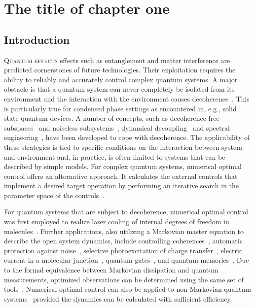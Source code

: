 
\chapter{The title of chapter one}

\section{Introduction}
\label{sec:intro}

\lettrine[lines=2]{Q}{uantum effects}
effects such as entanglement and matter interference are
predicted cornerstones of future technologies. Their exploitation
requires the ability to reliably and accurately control complex
quantum systems. A major obstacle is that a quantum system
can never completely be isolated from its environment and the
interaction with the environment causes 
decoherence~\cite{BreuerBook}. This is particularly true for condensed
phase settings as encountered in, e.g., solid state quantum devices. 
A number of concepts, such as decoherence-free subspaces~\cite{LidarPRL98}
and noiseless subsystems~\cite{LorenzaSci01}, dynamical
decoupling~\cite{LorenzaPRL99} and spectral
engineering~\cite{ClausenPRL10}, have been developed to cope with 
decoherence. The applicability of these strategies is tied to specific
conditions on the interaction between system and environment and,
in practice, is often  limited to systems that can be described by simple
models. For complex quantum systems, numerical optimal control offers an
alternative approach. It calculates the external controls that
implement a desired target operation by performing an iterative search
in the parameter space of the controls~\cite{RiceBook}. 

For quantum systems that are subject to decoherence, numerical optimal
control was first employed 
to realize laser cooling of internal degrees of freedom in
molecules~\cite{BartanaJCP97}. Further applications, also utilizing a
Markovian master equation to describe the open system dynamics, 
include controlling coherences~\cite{OhtsukiJCP99}, automatic
protection against noise~\cite{KallushPRA06}, selective
photoexcitation of charge transfer~\cite{TremblayPRA08},
electric current in a molecular junction~\cite{KleinekathoeferEPJB10},
quantum gates~\cite{ToSHJPB11}, and 
quantum memories~\cite{GormanPRA12}. Due to the formal equivalence
between Markovian 
dissipation and quantum measurements, optimized observations can be
determined using the same set of tools~\cite{ShuangJCP07}. 
Numerical optimal control can also be applied to non-Markovian
quantum
systems~\cite{RebentrostPRL09,AsplundPRL11,SchmidtPRL11,FloetherNJP12} 
provided the dynamics can be calculated with sufficient efficiency. 

